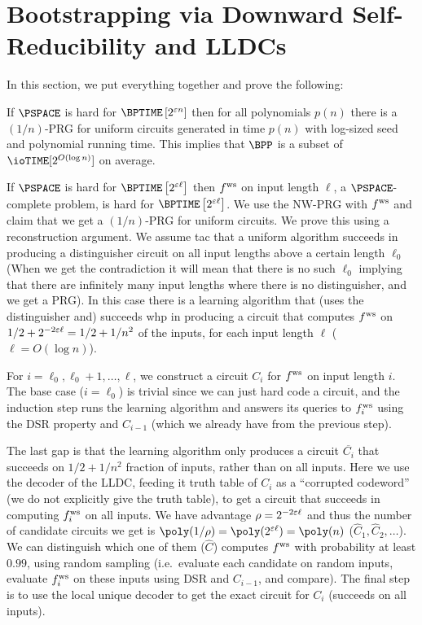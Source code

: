 \section{Bootstrapping via Downward Self-Reducibility and LLDCs}
In this section, we put everything together and prove the following:
\begin{theorem}
	If $\PSPACE$ is hard for $\BPTIME\left[2^{\eps n}\right]$ then for all polynomials $p(n)$ there is a $(1/n)$-PRG for uniform circuits generated in time $p(n)$ with log-sized seed and polynomial running time. This implies that $\BPP$ is a subset of $\ioTIME[2^{O(\log n)}]$ on average.
\end{theorem}


If $\PSPACE$ is hard for $\BPTIME\left[2^{\eps \ell}\right]$ then $ f^{\text{ws}} $ on input length $\ell$, a $\PSPACE$-complete problem, is hard for $\BPTIME\left[2^{\eps \ell}\right]$. 
We use the NW-PRG with $ f^{\text{ws}} $ and claim that we get a $(1/n)$-PRG for uniform circuits. We prove this using a reconstruction argument. 
We assume tac that a uniform algorithm succeeds in producing a distinguisher circuit on all input lengths above a certain length $\ell_0$ (When we get the contradiction it will mean that there is no such $\ell_0$ implying that there are infinitely many input lengths where there is no distinguisher, and we get a PRG). In this case there is a learning algorithm that (uses the distinguisher and) succeeds whp in producing a circuit that computes $ f^{\text{ws}} $ on $1/2+2^{-2\varepsilon \ell} = 1/2+1/n^2$ of the inputs, for each input length $\ell$ ($\ell=O(\log n )$). 

For $i=\ell_0,\ell_0+1,\ldots,\ell$, we construct a circuit $C_i$ for $ f^{\text{ws}} $ on input length $i$. The base case ($i=\ell_0$) is trivial since we can just hard code a circuit, and the induction step runs the learning algorithm and answers its queries to $ f^{\text{ws}} _i$ using the DSR property and $C_{i-1}$ (which we already have from the previous step). 

The last gap is that the learning algorithm only produces a circuit $\overline{C_i}$ that succeeds on $1/2+1/n^2$ fraction of inputs, rather than on all inputs. Here we use the decoder of the LLDC, feeding it truth table of $C_i$ as a ``corrupted codeword'' (we do not explicitly give the truth table), to get a circuit that succeeds in computing $ f^{\text{ws}} _i$ on all inputs. We have advantage $\rho = 2^{-2\varepsilon \ell}$ and thus the number of candidate circuits we get is $\poly(1/\rho) = \poly(2^{\eps \ell}) = \poly(n)$ ($\hat{C}_1,\hat{C}_2,\ldots$).
We can distinguish which one of them ($\hat{C}$) computes $ f^{\text{ws}} $ with probability at least $0.99$, using random sampling (i.e.\, evaluate each candidate on random inputs, evaluate $ f^{\text{ws}} _i$ on these inputs using DSR and $C_{i-1}$, and compare). The final step is to use the local unique decoder to get the exact circuit for $C_i$ (succeeds on all inputs). 

